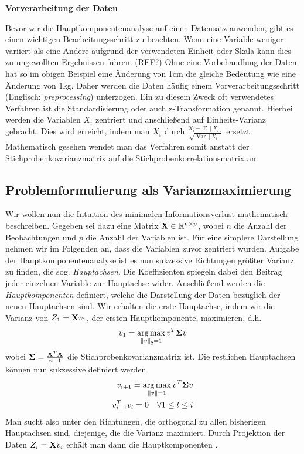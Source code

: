 \textbf{Vorverarbeitung der Daten}

Bevor wir die Hauptkomponentenanalyse auf einen Datensatz anwenden, gibt es einen wichtigen Bearbeitungsschritt zu beachten. Wenn eine Variable weniger variiert als eine Andere aufgrund der verwendeten Einheit oder Skala kann dies zu ungewollten Ergebnissen führen. (REF?) Ohne eine Vorbehandlung der Daten hat so im obigen Beispiel eine Änderung von 1cm die gleiche Bedeutung wie eine Änderung von 1kg.  Daher werden die Daten häufig einem Vorverarbeitungsschritt (Englisch: \textit{preprocessing}) unterzogen. Ein zu diesem Zweck oft verwendetes Verfahren ist die Standardisierung oder auch z-Transformation genannt. Hierbei werden die Variablen $X_i$ zentriert und anschließend auf Einheits-Varianz gebracht. Dies wird erreicht, indem man $X_i$ durch $\frac{X_i - \operatorname{E}[X_i]}{\sqrt{\operatorname{Var}[X_i]}}$ ersetzt. Mathematisch gesehen wendet man das Verfahren somit anstatt der Stichprobenkovarianzmatrix auf die Stichprobenkorrelationsmatrix an.

\subsection{Problemformulierung als Varianzmaximierung}

Wir wollen nun die Intuition des minimalen Informationsverlust mathematisch beschreiben. Gegeben sei dazu eine Matrix $\mathbf{X} \in \mathbb{R}^{n\times p}$, wobei $n$ die Anzahl der Beobachtungen und $p$ die Anzahl der Variablen ist. Für eine simplere Darstellung nehmen wir im Folgenden an, dass die Variablen zuvor zentriert wurden. Aufgabe der Hauptkomponentenanalyse ist es nun sukzessive Richtungen größter Varianz zu finden, die sog. \textit{Hauptachsen}. Die Koeffizienten spiegeln dabei den Beitrag jeder einzelnen Variable zur Hauptachse wider. Anschließend werden die \textit{Hauptkomponenten} definiert, welche die Darstellung der Daten bezüglich der neuen Hauptachsen sind. Wir erhalten die erste Hauptachse, indem wir die Varianz von $Z_1 = \mathbf{X}v_1$, der ersten Hauptkomponente, maximieren, d.h.
\begin{align}
\label{pca_variance_maximization_first}
v_1 = \operatorname*{arg\,max}_{\left\lVert v \right\rVert_2 = 1} v^T \mathbf{\Sigma} v
\end{align}
wobei $\mathbf{\Sigma} = \frac{\mathbf{X}^T\mathbf{X}}{n-1}$ die Stichprobenkovarianzmatrix ist. Die restlichen Hauptachsen können nun sukzessive definiert werden
\begin{align}
\label{pca_variance_maximization_rest}
\begin{split}
v_{i+1} = \operatorname*{arg\,max}_{\left\lVert v \right\rVert = 1} v^T \mathbf{\Sigma} v\\
v_{i+1}^Tv_l = 0 \quad \forall 1 \leq l \leq i
\end{split}
\end{align}
Man sucht also unter den Richtungen, die orthogonal zu allen bisherigen Hauptachsen sind, diejenige, die die Varianz maximiert. Durch Projektion der Daten $Z_i = \mathbf{X}v_i$ erhält man dann die Hauptkomponenten \cite{vidal}.

